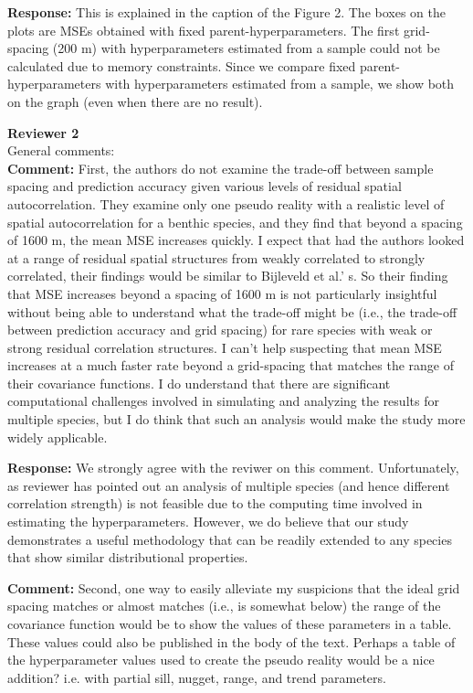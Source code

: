 \documentclass{letter}
\begin{document}
\begin{letter}
\textbf{Response:}
This is explained in the caption of the Figure 2. The boxes on the plots are MSEs obtained with fixed parent-hyperparameters.  The first grid-spacing (200 m) with hyperparameters estimated from a sample could not be calculated due to memory constraints. Since we compare fixed parent-hyperparameters with hyperparameters estimated from a sample, we show both on the graph (even when there are no result). 

\textbf{Reviewer 2}\\

General comments:\\

\textbf{Comment:} 
First, the authors do not examine the trade-off between sample spacing and prediction accuracy given various levels of residual spatial autocorrelation. They examine only one pseudo reality with a realistic level of spatial autocorrelation for a benthic species, and they find that beyond a spacing of 1600 m, the mean MSE increases quickly.  I expect that had the authors looked at a range of residual spatial structures from weakly correlated to strongly correlated, their findings would be similar to Bijleveld et al.' s. So their finding that MSE increases beyond a spacing of 1600 m is not particularly insightful without being able to understand what the trade-off might be (i.e., the trade-off between prediction accuracy and grid spacing) for rare species with weak or strong residual correlation structures. I can't help suspecting that mean MSE increases at a much faster rate beyond a grid-spacing that matches the range of their covariance functions. I do understand that there are significant computational challenges involved in simulating and analyzing the results for multiple species, but I do think that such an analysis would make the study more widely applicable. 

\textbf{Response:}
We strongly agree with the reviwer on this comment. Unfortunately, as reviewer has pointed out an analysis of multiple species (and hence different correlation strength) is not feasible due to the computing time involved in estimating the hyperparameters. However, we do believe that our study demonstrates a useful methodology that can be readily extended to any species that show similar distributional properties.

\textbf{Comment:} 
Second, one way to easily alleviate my suspicions that the ideal grid spacing matches or almost matches (i.e., is somewhat below) the range of the covariance function would be to show the values of these parameters in a table. These values could also be published in the body of the text. Perhaps a table of the hyperparameter values used to create the pseudo reality would be a nice addition?    i.e. with partial sill, nugget, range, and trend parameters.      


\end{letter}
\end{document}

